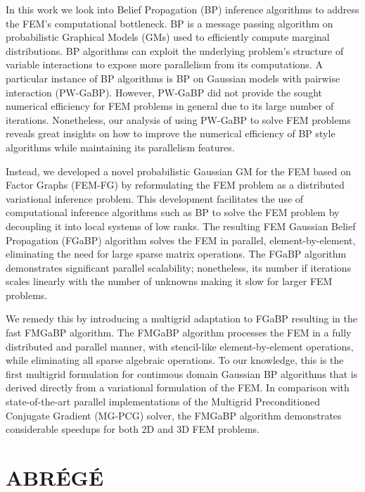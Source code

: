 \documentclass [12pt,letterpaper]{report}
\begin{document}
In this work we look into Belief Propagation (BP) inference algorithms to address the FEM's computational bottleneck.
BP is a message passing algorithm on probabilistic Graphical Models (GMs) used to efficiently compute marginal distributions.
BP algorithms can exploit the underlying problem's structure of variable interactions to expose more parallelism from its computations.
A particular instance of BP algorithms is BP on Gaussian models with pairwise interaction (PW-GaBP).
However, PW-GaBP did not provide the sought numerical efficiency for FEM problems in general due to its large number of iterations.
Nonetheless, our analysis of using PW-GaBP to solve FEM problems reveals great insights on how to improve the numerical efficiency of BP style algorithms while maintaining its parallelism features.


Instead, we developed a novel probabilistic Gaussian GM for the FEM based on Factor Graphs (FEM-FG) by reformulating the FEM problem as a distributed variational inference problem.
This development facilitates the use of computational inference algorithms such as BP to solve the FEM problem by decoupling it into local systems of low ranks.
The resulting FEM Gaussian Belief Propagation (FGaBP) algorithm solves the FEM in parallel, element-by-element, eliminating the need for large sparse matrix operations.
The FGaBP algorithm demonstrates significant parallel scalability; nonetheless, its number if iterations scales linearly with the number of unknowns making it slow for larger FEM problems.

We remedy this by introducing a multigrid adaptation to FGaBP resulting in the fast FMGaBP algorithm.
The FMGaBP algorithm processes the FEM in a fully distributed and parallel manner, with stencil-like element-by-element operations, while eliminating all sparse algebraic operations.
To our knowledge, this is the first multigrid formulation for continuous domain Gaussian BP algorithms that is derived directly from a variational formulation of the FEM.
In comparison with state-of-the-art parallel implementations of the Multigrid Preconditioned Conjugate Gradient (MG-PCG) solver, the FMGaBP algorithm demonstrates considerable speedups for both 2D and 3D FEM problems.


\newpage

\section*{\centering \MakeUppercase{ABR\'{E}G\'{E}}}
\end{document}
